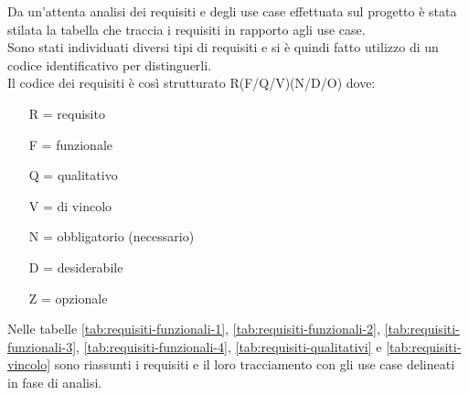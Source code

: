 Da un'attenta analisi dei requisiti e degli use case effettuata sul progetto è stata stilata la tabella che traccia i requisiti in rapporto agli use case.\\
Sono stati individuati diversi tipi di requisiti e si è quindi fatto utilizzo di un codice identificativo per distinguerli.\\
Il codice dei requisiti è così strutturato R(F/Q/V)(N/D/O) dove:
\begin{enumerate}
	\item[R =] requisito
    \item[F =] funzionale
    \item[Q =] qualitativo
    \item[V =] di vincolo
    \item[N =] obbligatorio (necessario)
    \item[D =] desiderabile
    \item[Z =] opzionale
\end{enumerate}
Nelle tabelle \ref{tab:requisiti-funzionali-1}, \ref{tab:requisiti-funzionali-2}, \ref{tab:requisiti-funzionali-3}, \ref{tab:requisiti-funzionali-4}, \ref{tab:requisiti-qualitativi} e \ref{tab:requisiti-vincolo} sono riassunti i requisiti e il loro tracciamento con gli use case delineati in fase di analisi.

\clearpage


